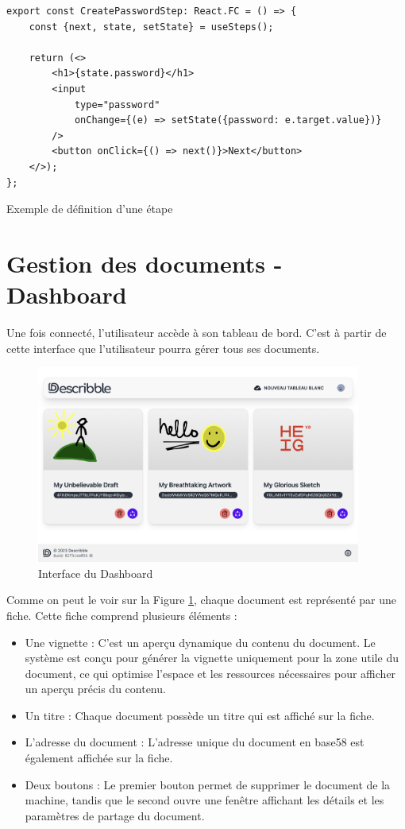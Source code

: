 \begin{listing}[H]
    \begin{verbatim}
export const CreatePasswordStep: React.FC = () => {
    const {next, state, setState} = useSteps();

    return (<>
        <h1>{state.password}</h1>
        <input 
            type="password" 
            onChange={(e) => setState({password: e.target.value})}
        />
        <button onClick={() => next()}>Next</button>
    </>);
};
  \end{verbatim}
    \caption{Exemple de définition d'une étape}
\end{listing}

\section{Gestion des documents - Dashboard}

Une fois connecté, l'utilisateur accède à son tableau de bord. C'est à partir de cette interface que l'utilisateur pourra gérer tous ses documents.

\begin{figure}[H]
    \centering
    \includegraphics[width=0.95\textwidth]{assets/figures/describble-dashboard.png}
    \caption{Interface du Dashboard}
    \label{fig:dashboard}
\end{figure}

Comme on peut le voir sur la Figure \ref{fig:dashboard}, chaque document est représenté par une fiche. Cette fiche comprend plusieurs éléments :

\begin{itemize}
    \item Une vignette : C'est un aperçu dynamique du contenu du document. Le système est conçu pour générer la vignette uniquement pour la zone utile du document, ce qui optimise l'espace et les ressources nécessaires pour afficher un aperçu précis du contenu.
    \item Un titre : Chaque document possède un titre qui est affiché sur la fiche.
    \item L'adresse du document : L'adresse unique du document en base58 est également affichée sur la fiche.
    \item Deux boutons : Le premier bouton permet de supprimer le document de la machine, tandis que le second ouvre une fenêtre affichant les détails et les paramètres de partage du document.
\end{itemize}

